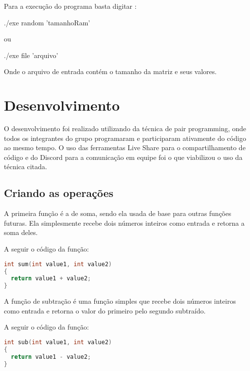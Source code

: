 \documentclass{article}
\begin{document}
Para a execução do programa basta digitar :
\begin{tcolorbox}[title=,width=\linewidth]
    ./exe random 'tamanhoRam'
\end{tcolorbox}

ou

\begin{tcolorbox}[title=,width=\linewidth]
    ./exe file 'arquivo'
\end{tcolorbox}

Onde o arquivo de entrada contém o tamanho da matriz e seus valores.

\clearpage
\section{Desenvolvimento}

\DESCRICAO{}
O desenvolvimento foi realizado utilizando da técnica de pair programming, onde todos os integrantes do grupo programaram e participaram ativamente do código ao mesmo tempo. O uso das ferramentas Live Share para o compartilhamento de código e do Discord para a comunicação em equipe foi o que viabilizou o uso da técnica citada.

\subsection{Criando as operações}

\DESCRICAO{}
A primeira função é a de soma, sendo ela usada de base para outras funções futuras.  Ela simplesmente recebe dois números inteiros como entrada e retorna a soma deles.

\hfill \breakline

\noindent A seguir o código da função:
\begin{lstlisting}[caption={Função de soma.},label={lst:cod2},language=C]
int sum(int value1, int value2)
{
  return value1 + value2;
}
 \end{lstlisting}
 
  A função de subtração é uma função simples que recebe dois números inteiros como entrada e retorna o valor do primeiro pelo segundo subtraído.
  
 \hfill\breakline
  
 \noindent A seguir o código da função:
 \begin{lstlisting}[caption={Função de subtração.},label={lst:cod2},language=C]
int sub(int value1, int value2)
{
  return value1 - value2;
}
 \end{lstlisting}
\end{document}
